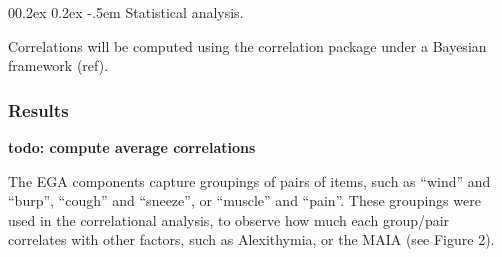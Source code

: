 \documentclass[
  man,
  floatsintext,
  longtable,
  nolmodern,
  notxfonts,
  notimes,
  colorlinks=true,linkcolor=blue,citecolor=blue,urlcolor=blue]{apa7}
\makeatletter
\renewcommand{\paragraph}{\@startsection{paragraph}{4}{\parindent}%
	{0\baselineskip \@plus 0.2ex \@minus 0.2ex}%
	{-.5em}%
	{\normalfont\normalsize\bfseries\typesectitle}}
\makeatother
\begin{document}
\paragraph{Statistical analysis.}\label{statistical-analysis-1}

Correlations will be computed using the correlation package under a
Bayesian framework (ref).

\subsubsection{Results}\label{results-1}

\textbf{todo: compute average correlations }

The EGA components capture groupings of pairs of items, such as ``wind''
and ``burp'', ``cough'' and ``sneeze'', or ``muscle'' and ``pain''.
These groupings were used in the correlational analysis, to observe how
much each group/pair correlates with other factors, such as Alexithymia,
or the MAIA (see Figure 2).
\end{document}
